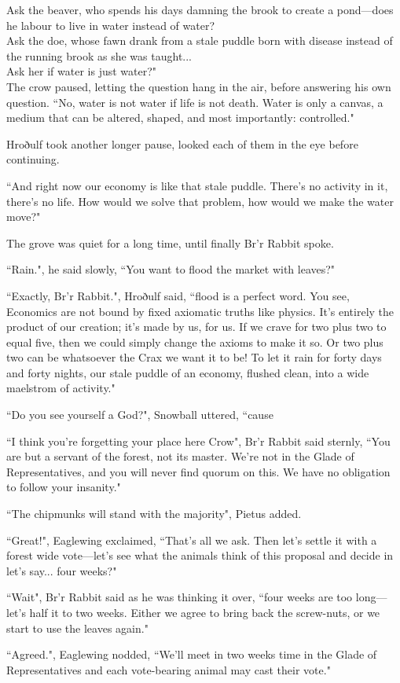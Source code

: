 Ask the beaver, who spends his days damning the brook to create a pond---does he labour to live in water instead of water?\\

Ask the doe, whose fawn drank from a stale puddle born with disease instead of the running brook as she was taught...\\
Ask her if water is just water?"\\

The crow paused, letting the question hang in the air, before answering his own question.
``No, water is not water if life is not death. Water is only a canvas, a medium that can be altered, shaped, and most importantly: controlled."

Hroðulf took another longer pause, looked each of them in the eye before continuing.

``And right now our economy is like that stale puddle. There's no activity in it, there's no life. How would we solve that problem, how would we make the water move?"

The grove was quiet for a long time, until finally Br'r Rabbit spoke.

``Rain.", he said slowly, ``You want to flood the market with leaves?"

``Exactly, Br'r Rabbit.", Hroðulf said, ``flood is a perfect word.
You see, Economics are not bound by fixed axiomatic truths like physics. It's entirely the product of our creation; it's made by us, for us. If we crave for two plus two to equal five, then we could simply change the axioms to make it so. Or two plus two can be whatsoever the Crax we want it to be! To let it rain for forty days and forty nights, our stale puddle of an economy, flushed clean, into a wide maelstrom of activity."

``Do you see yourself a God?", Snowball uttered, ``cause

``I think you're forgetting your place here Crow", Br'r Rabbit said sternly, ``You are but a servant of the forest, not its master. We're not in the Glade of Representatives, and you will never find quorum on this. We have no obligation to follow your insanity."

``The chipmunks will stand with the majority", Pietus added.

``Great!", Eaglewing exclaimed, ``That's all we ask. Then let's settle it with a forest wide vote---let's see what the animals think of this proposal and decide in let's say... four weeks?"

``Wait", Br'r Rabbit said as he was thinking it over, ``four weeks are too long---let's half it to two weeks. Either we agree to bring back the screw-nuts, or we start to use the leaves again."

``Agreed.", Eaglewing nodded, ``We'll meet in two weeks time in the Glade of Representatives and each vote-bearing animal may cast their vote."















